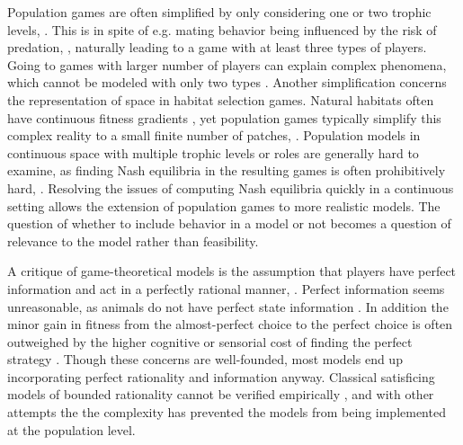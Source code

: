 Population games are often simplified by only considering  one or two trophic levels, \citep{kvrivan2007lotka, sadowski2019predator}. This is in spite of e.g. mating behavior being influenced by the risk of predation, \citep{carranza1999red,lima2009predators}, naturally leading to a game with at least three types of players. Going to games with larger number of players can explain complex phenomena, which cannot be modeled with only two types \citep{pinti2019trophic}. Another simplification concerns the representation of space in habitat selection games.  Natural habitats often have continuous fitness gradients \citep{kawecki2004conceptual}, yet population games typically simplify this complex reality to a small finite number of patches, \cite{valdovinos2010consequences}. Population models in continuous space with multiple trophic levels or roles are generally hard to examine, as finding Nash equilibria in the resulting games is often prohibitively hard, \citep{empirical_trait,pinti2019trophic}. Resolving the issues of computing Nash equilibria quickly in a continuous setting allows the extension of population games to more realistic models. The question of whether to include behavior in a model or not becomes a question of relevance to the model rather than feasibility.


A critique of game-theoretical models is the assumption that players have perfect information and act in a perfectly rational manner, \citep{jones1999bounded}. Perfect information seems unreasonable, as animals do not have perfect state information \citep{simon1955behavioral}. In addition the minor gain in fitness from the almost-perfect choice to the perfect choice is often outweighed by the higher cognitive or sensorial cost of finding the perfect strategy \citep{simon1956rational, cohen2019bounded}. Though these concerns are well-founded, most models end up incorporating perfect rationality and information anyway. Classical satisficing models of bounded rationality cannot be verified empirically \citep{nonacs1993satisficing}, and with other attempts the \citep{bayesianmodel, thuijsman1995automata} the complexity has prevented the models from being implemented at the population level.


